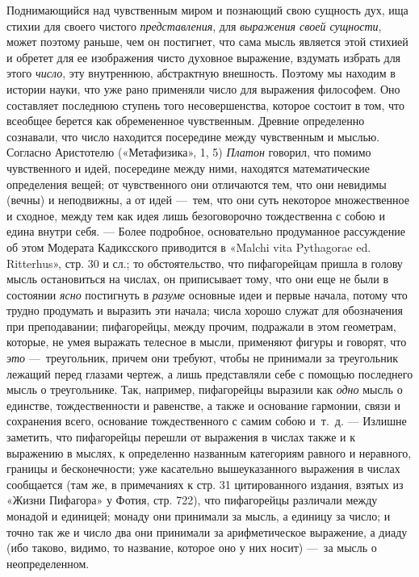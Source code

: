 Поднимающийся над чувственным миром и познающий свою сущность дух, ища
стихии для своего чистого {\em представления}, для
{\em выражения своей сущности}, может поэтому раньше,
чем он постигнет, что сама мысль является этой стихией и обретет для ее
изображения чисто духовное выражение, вздумать избрать для этого
{\em число}, эту внутреннюю, абстрактную внешность.
Поэтому мы находим в истории науки, что уже рано применяли число для
выражения философем. Оно составляет последнюю ступень того несовершенства,
которое состоит в том, что всеобщее берется как обремененное чувственным.
Древние определенно сознавали, что число находится посередине между
чувственным и мыслью. Согласно Аристотелю («Метафизика», 1, 5)
{\em Платон} говорил, что помимо чувственного и идей,
посередине между ними, находятся математические определения вещей; от
чувственного они отличаются тем, что они невидимы (вечны) и неподвижны, а
от идей —~тем, что они суть некоторое множественное и сходное, между тем
как идея лишь безоговорочно тождественна с собою и едина внутри себя. —
Более подробное, основательно продуманное рассуждение об этом Модерата
Кадиксского приводится в «Malchi vita Pythagorae ed. Ritterhus», стр. 30 и
сл.; то обстоятельство, что пифагорейцам пришла в голову мысль остановиться
на числах, он приписывает тому, что они еще не были в состоянии
{\em ясно} постигнуть в
{\em разуме} основные идеи и первые начала, потому что
трудно продумать и выразить эти начала; числа хорошо служат для обозначения
при преподавании; пифагорейцы, между прочим, подражали в этом геометрам,
которые, не умея выражать телесное в мысли, применяют фигуры и говорят, что
{\em это} —~треугольник, причем они требуют, чтобы не
принимали за треугольник лежащий перед глазами чертеж, а лишь представляли
себе с помощью последнего мысль о треугольнике. Так, например, пифагорейцы
выразили как {\em одно} мысль о единстве,
тождественности и равенстве, а также и основание гармонии, связи и
сохранения всего, основание тождественного с самим собою и~т.~д. — Излишне
заметить, что пифагорейцы перешли от выражения в числах также и к выражению
в мыслях, к определенно названным категориям равного и неравного, границы и
бесконечности; уже касательно вышеуказанного выражения в числах сообщается
(там же, в примечаниях к стр. 31 цитированного издания, взятых из «Жизни
Пифагора» у Фотия, стр. 722), что пифагорейцы различали между монадой и
единицей; монаду они принимали за мысль, а единицу за число; и точно так же
и число два они принимали за арифметическое выражение, а диаду (ибо таково,
видимо, то название, которое оно у них носит) —~за мысль о неопределенном.
